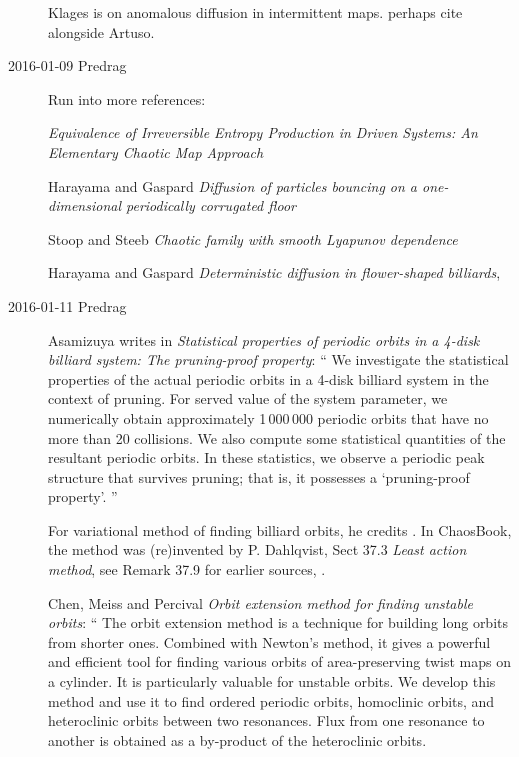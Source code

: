 \begin{description}
                                                    \toCB
Klages is on anomalous diffusion in intermittent maps.
perhaps cite alongside Artuso.



    \item[2016-01-09 Predrag] Run into more references:

 {\em Equivalence of Irreversible Entropy Production in
Driven Systems: An Elementary Chaotic Map Approach}

Harayama and Gaspard
   {\em Diffusion of particles bouncing on a one-dimensional periodically
   corrugated floor}

Stoop and Steeb
 {\em Chaotic family with smooth {Lyapunov} dependence}

Harayama and Gaspard
   {\em Deterministic diffusion in flower-shaped billiards},

    \item[2016-01-11 Predrag] Asamizuya writes in
{\em Statistical properties of periodic orbits in a 4-disk billiard
system: {The} pruning-proof property}:
``
We investigate the statistical properties of the actual periodic orbits
in a 4-disk billiard system in the context of pruning. For served value
of the system parameter, we numerically obtain approximately 1\,000\,000
periodic orbits that have no more than 20 collisions. We also compute
some statistical quantities of the resultant periodic orbits. In these
statistics, we observe a periodic peak structure that survives pruning;
that is, it possesses a `pruning-proof property'.
''

                                                    \toCB
For variational method of finding billiard orbits, he credits
. In ChaosBook, the method was
(re)invented by P. Dahlqvist, Sect 37.3 {\em Least action method},
see Remark 37.9 for earlier sources,
.

Chen, Meiss and Percival
  {\em Orbit extension method for finding unstable orbits}: ``
The orbit extension method is a technique for building long orbits from
shorter ones. Combined with Newton's method, it gives a powerful and
efficient tool for finding various orbits of area-preserving twist maps
on a cylinder. It is particularly valuable for unstable orbits. We
develop this method and use it to find ordered periodic orbits,
homoclinic orbits, and heteroclinic orbits between two resonances. Flux
from one resonance to another is obtained as a by-product of the
heteroclinic orbits.


\end{description}
